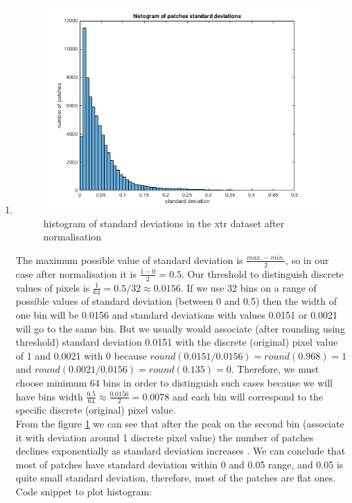\documentclass{article}
\begin{document}
			 \begin{enumerate}[label=(\alph*)]
			 	\item
				 	\begin{figure}[htp]
				 		\centering
				 		\includegraphics[width=12cm]{images/p1-1-a_std_hist}
				 		\caption{histogram of standard deviations in the xtr dataset after normalisation}
				 		\label{fig:p1-1-a_std_hist}
				 	\end{figure}
				 	The maximum possible value of standard deviation is $\frac{max. - min.}{2}$, so in our case after normalisation it is $\frac{1 - 0}{2}= 0.5$. Our threshold to distinguish discrete values of pixels is $\frac{1}{64} = 0.5 / 32 \approx 0.0156$. If we use 32 bins on a range of possible values of standard deviation (between 0 and 0.5) then the width of one bin will be 0.0156 and standard deviations with values  0.0151 or 0.0021 will go to the same bin. But we usually would associate (after rounding using threshold) standard deviation 0.0151 with the discrete (original) pixel value of 1 and 0.0021 with 0 because $round(0.0151/0.0156)=round(0.968)=1$ and $round(0.0021/0.0156)=round(0.135)=0$. Therefore, we must choose minimum 64 bins in order to distinguish such cases because we will have bins width $\frac{0.5}{64} \approx \frac{0.0156}{2} = 0.0078$ and each bin will correspond to the specific discrete (original) pixel value.\\
				 	From the figure \ref{fig:p1-1-a_std_hist} we can see that after the peak on the second bin (associate it with deviation around 1 discrete pixel value) the number of patches declines exponentially as  standard deviation increases . We can conclude that most of patches have standard deviation within 0 and 0.05 range, and 0.05 is quite small standard deviation, therefore, most of the patches are flat ones. \\
				 	Code snippet to plot histogram:
				 	
				 	

\end{enumerate}
\end{document}
